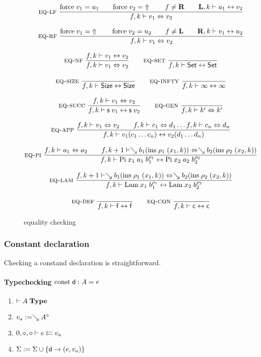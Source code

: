 \begin{figure}[p]
\begin{gather*}
\nru{\eqlf}
{\forc \; v_1 = u_1 \qquad \forc \; v_2 = \stuck 
\qquad
f \neq \rF \qquad \FeqVal{\lF}{k}{u_1}{v_2}}
{ \EqVal{f}{k}{v_1}{v_2}}
\\[2ex]
\nru{\eqrf}
{\forc \; v_1 = \stuck \qquad \forc \; v_2 = u_2 
\qquad
f \neq \lF \qquad \FeqVal{\rF}{k}{v_1}{u_2}}
{ \EqVal{f}{k}{v_1}{v_2}}
\\[2ex]
\nru{\eqnf}
{\FeqVal{f}{k}{v_1}{v_2}}
{ \EqVal{f}{k}{v_1}{v_2}}
\qquad
\nru{\eqset}
{}
{\FeqVal{f}{k}{\Set}{\Set}}
\\[2ex]
\nru{\eqsize}
{}
{\FeqVal{f}{k}{\Size}{\Size}}
\qquad
\nru{\eqinfty}
{}
{\FeqVal{f}{k}{\infty}{\infty}}
\\[2ex]
\nru{\eqsuc}
{\EqVal{f}{k}{v_1}{v_2}}
{\FeqVal{f}{k}{\s v_1}{\s v_2}}
\qquad
\nru{\eqgen}
{}
{\EqVal{f}{k}{k'}{k'}}
\\[2ex]
\nru{\eqapp}
{\EqVal{f}{k}{v_1}{v_2} \qquad
\EqVal{f}{k}{c_1}{d_1} \ldots \EqVal{f}{k}{c_n}{d_n}}
{\FeqVal{f}{k}{v_1 (c_1 \ldots c_n)}{v_2 (d_1 \ldots d_n)}}
\\[2ex]
\nru{\eqpi}
{\EqVal{f}{k}{a_1}{a_2}
\qquad
\EqVal{f}{k+1}{\wh b_1 (\ins \; \rho_1 \; (x_1,k))}{\wh b_2 (\ins \; \rho_2 \; (x_2,k))}}
{\FeqVal{f}{k}{\vpi \; x_1 \; a_1 \; \cl{b_1}{\rho_1}}{\vpi \; x_2 \; a_2 \; \cl{b_2}{\rho_2}}}
\\[2ex]
\nru{\eqlam}
{\EqVal{f}{k+1}{\wh b_1 (\ins \; \rho_1 \; (x_1,k))}{\wh b_2 (\ins \; \rho_2 \; (x_2,k))}}
{\FeqVal{f}{k}{\vlam \; x_1 \; \cl{b_1}{\rho_1}}{\vlam \; x_2 \; \cl{b_2}{\rho_2}}}
\\[2ex]
\nru{\eqdef}
{}
{\FeqVal{f}{k}{\ff}{\ff}}
\qquad
\nru{\eqcon}
{}
{\FeqVal{f}{k}{\cc}{\cc}}
\end{gather*}
\caption{equality checking}
\end{figure}

\subsubsection{Constant declaration}

Checking a constand declaration is straightforward.
\paragraph*{Typechecking $\const \dd : A = e $}
\begin{enumerate}
\item
$\IsType{A}$
\item
$ v_a := \wh \cl{A}{\diamond}$
\item
$\Check{0}{\diamond}{\diamond}{e}{v_a}$
\item
$\Sig := \Sig \cup \{\dd \ra (e,v_a)\}$
\end{enumerate}

